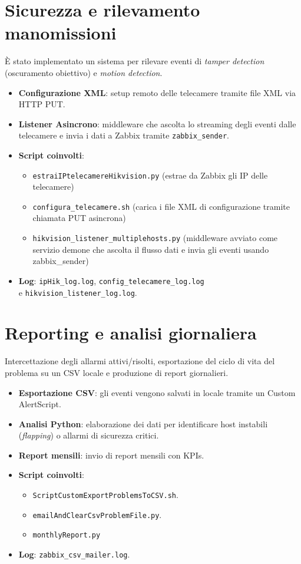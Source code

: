\documentclass[12pt, a4paper]{report}
\begin{document}
\section{Sicurezza e rilevamento manomissioni}
È stato implementato un sistema per rilevare eventi di \textit{tamper detection} (oscuramento obiettivo) e \textit{motion detection}.
\begin{itemize}
    \item \textbf{Configurazione XML}: setup remoto delle telecamere tramite file XML via HTTP PUT.
    \item \textbf{Listener Asincrono}: middleware che ascolta lo streaming degli eventi dalle telecamere e invia i dati a Zabbix tramite \texttt{zabbix\_sender}.
    \item \textbf{Script coinvolti}:
    \begin{itemize}
        \item \texttt{estraiIPtelecamereHikvision.py} (estrae da Zabbix gli IP delle telecamere)
        \item \texttt{configura\_telecamere.sh} (carica i file XML di configurazione tramite chiamata PUT asincrona)
        \item \texttt{hikvision\_listener\_multiplehosts.py} (middleware avviato come servizio demone che ascolta il flusso dati e invia gli eventi usando zabbix\_sender)
    \end{itemize}
    \item \textbf{Log}: \texttt{ipHik\_log.log}, \texttt{config\_telecamere\_log.log} \\e \texttt{hikvision\_listener\_log.log}.
\end{itemize}

\section{Reporting e analisi giornaliera}
Intercettazione degli allarmi attivi/risolti, esportazione del ciclo di vita del problema su un CSV locale e produzione di report giornalieri.
\begin{itemize}
    \item \textbf{Esportazione CSV}: gli eventi vengono salvati in locale tramite un Custom AlertScript.
    \item \textbf{Analisi Python}: elaborazione dei dati per identificare host instabili (\textit{flapping}) o allarmi di sicurezza critici.
    \item \textbf{Report mensili}: invio di report mensili con KPIs.
    \item \textbf{Script coinvolti}:
    \begin{itemize}
        \item \texttt{ScriptCustomExportProblemsToCSV.sh}.
        \item \texttt{emailAndClearCsvProblemFile.py}.
        \item \texttt{monthlyReport.py}
    \end{itemize}
    \item \textbf{Log}: \texttt{zabbix\_csv\_mailer.log}.
\end{itemize}
\end{document}
